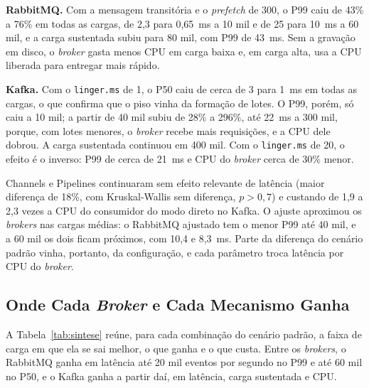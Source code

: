 \documentclass[12pt]{article}
\begin{document}
\textbf{RabbitMQ.} Com a mensagem transitória e o \textit{prefetch} de 300, o P99 caiu de
43\% a 76\% em todas as cargas, de 2,3 para 0,65~ms a 10 mil e de 25 para 10~ms a 60 mil,
e a carga sustentada subiu para 80 mil, com P99 de 43~ms. Sem a gravação em disco, o
\textit{broker} gasta menos CPU em carga baixa e, em carga alta, usa a CPU liberada para entregar
mais rápido.

\textbf{Kafka.} Com o \texttt{linger.ms} de 1, o P50 caiu de cerca de 3 para 1~ms em todas
as cargas, o que confirma que o piso vinha da formação de lotes. O P99, porém, só caiu a
10 mil; a partir de 40 mil subiu de 28\% a 296\%, até 22~ms a 300 mil, porque, com lotes
menores, o \textit{broker} recebe mais requisições, e a CPU dele dobrou. A carga sustentada
continuou em 400 mil. Com o \texttt{linger.ms} de 20, o efeito é o inverso: P99 de cerca
de 21~ms e CPU do \textit{broker} cerca de 30\% menor.

Channels e Pipelines continuaram sem efeito relevante de latência (maior diferença de
18\%, com Kruskal-Wallis sem diferença, $p > 0{,}7$) e custando de 1,9 a 2,3 vezes a CPU
do consumidor do modo direto no Kafka. O ajuste aproximou os \textit{brokers} nas cargas médias: o
RabbitMQ ajustado tem o menor P99 até 40 mil, e a 60 mil os dois ficam próximos, com 10,4
e 8,3~ms. Parte da diferença do cenário padrão vinha, portanto, da configuração, e cada
parâmetro troca latência por CPU do \textit{broker}.

\subsection{Onde Cada \textit{Broker} e Cada Mecanismo Ganha}
\label{sec:sintese}

A Tabela~\ref{tab:sintese} reúne, para cada combinação do cenário padrão, a faixa de
carga em que ela se sai melhor, o que ganha e o que custa. Entre os \textit{brokers}, o RabbitMQ
ganha em latência até 20 mil eventos por segundo no P99 e até 60 mil no P50, e o Kafka
ganha a partir daí, em latência, carga sustentada e CPU.
\end{document}
